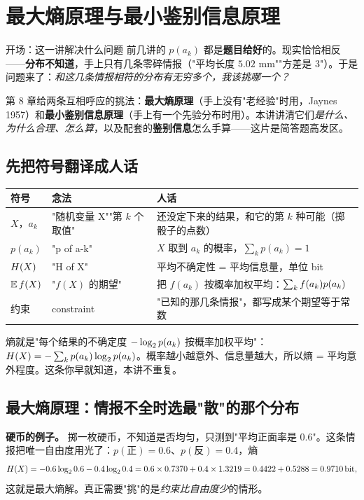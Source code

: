 \section{最大熵原理与最小鉴别信息原理}

\begin{idea}{开场：这一讲解决什么问题}
前几讲的 $p(a_k)$ 都是\textbf{题目给好}的。现实恰恰相反——\textbf{分布不知道}，手上只有几条零碎情报（"平均长度 $5.02$ mm""方差是 $3$"）。于是问题来了：\emph{和这几条情报相符的分布有无穷多个，我该挑哪一个？}

第 8 章给两条互相呼应的挑法：\textbf{最大熵原理}（手上没有"老经验"时用，Jaynes 1957）和\textbf{最小鉴别信息原理}（手上有一个先验分布时用）。本讲讲清它们\emph{是什么、为什么合理、怎么算}，以及配套的\textbf{鉴别信息}怎么手算——这片是简答题高发区。
\end{idea}

\subsection{先把符号翻译成人话}

\begin{center}\small
\begin{tabular}{lll}
\toprule
符号 & 念法 & 人话 \\
\midrule
$X$，$a_k$ & "随机变量 X""第 $k$ 个取值" & 还没定下来的结果，和它的第 $k$ 种可能（掷骰子的点数） \\
$p(a_k)$ & "p of a-k" & $X$ 取到 $a_k$ 的概率，$\sum_k p(a_k)=1$ \\
$H\!\left(X\right)$ & "H of X" & 平均不确定性 = 平均信息量，单位 bit \\
$\operatorname{\mathbb{E}} f(X)$ & "$f(X)$ 的期望" & 把 $f(a_k)$ 按概率加权平均：$\sum_k f(a_k)p\!\left(a_k\right)$ \\
约束 & constraint & "已知的那几条情报"，都写成某个期望等于常数 \\
\bottomrule
\end{tabular}
\end{center}

熵就是"每个结果的不确定度 $-\log_{2}p\!\left(a_k\right)$ 按概率加权平均"：$H\!\left(X\right)=-\sum_kp\!\left(a_k\right)\log_{2}p\!\left(a_k\right)$。概率越小越意外、信息量越大，所以熵 = 平均意外程度。这条你早就知道，本讲不重复。

\subsection{最大熵原理：情报不全时选最"散"的那个分布}

\textbf{硬币的例子。} 掷一枚硬币，不知道是否均匀，只测到"平均正面率是 $0.6$"。这条情报把唯一自由度用光了：$p(\text{正})=0.6$、$p(\text{反})=0.4$，熵
\begin{align*}
H\!\left(X\right)=-0.6\log_{2} 0.6-0.4\log_{2} 0.4=0.6\times0.7370+0.4\times1.3219=0.4422+0.5288=0.9710\,\text{bit} ,
\end{align*}
这就是最大熵解。真正需要"挑"的是\emph{约束比自由度少}的情形。

